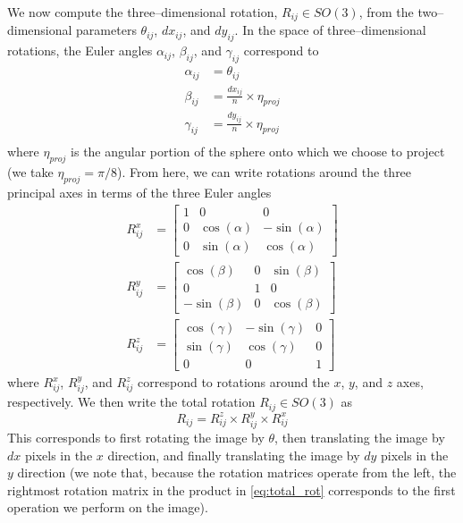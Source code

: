 \documentclass[12pt]{article}
\begin{document}
We now compute the three--dimensional rotation, $R_{ij} \in SO(3)$, from the two--dimensional parameters $\theta_{ij}$, $dx_{ij}$, and $dy_{ij}$.
%
In the space of three--dimensional rotations, the Euler angles $\alpha_{ij}$, $\beta_{ij}$, and $\gamma_{ij}$ correspond to
\begin{equation} \label{eq:angle_relations}
\begin{aligned}
	\alpha_{ij} &= \theta_{ij} \\
	\beta_{ij} &= \frac{dx_{ij}}{n} \times \eta_{proj} \\
	\gamma_{ij} &= \frac{dy_{ij}}{n} \times \eta_{proj} \\
\end{aligned}
\end{equation}
where $\eta_{proj}$ is the angular portion of the sphere onto which we choose to project (we take $\eta_{proj} =  \pi/8$).
%
From here, we can write rotations around the three principal axes in terms of the three Euler angles
\begin{equation}
\begin{aligned}
	R^x_{ij} &= \begin{bmatrix}
	1 & 0 & 0 \\
    0 & \cos(\alpha) & -\sin(\alpha) \\
    0 & \sin(\alpha) & \cos(\alpha)
	\end{bmatrix} \\
	R^y_{ij} &= \begin{bmatrix}
	\cos(\beta) & 0 & \sin(\beta) \\
    0 & 1 & 0 \\
    -\sin(\beta) & 0 & \cos(\beta)
    \end{bmatrix} \\
	R^z_{ij} &= \begin{bmatrix} 
	\cos(\gamma) & -\sin(\gamma) & 0 \\
    \sin(\gamma) & \cos(\gamma) & 0 \\
    0 & 0 & 1 
    \end{bmatrix}
\end{aligned}
\end{equation}
where $R^x_{ij}$, $R^y_{ij}$, and $R^z_{ij}$ correspond to rotations around the $x$, $y$, and $z$ axes, respectively.
%
We then write the total rotation $R_{ij} \in SO(3)$ as 
\begin{equation} \label{eq:total_rot}
	R_{ij}	 = R^z_{ij} \times R^y_{ij} \times R^x_{ij}
\end{equation}
%
This corresponds to first rotating the image by $\theta$, then translating the image by $dx$ pixels in the $x$ direction, and finally translating the image by $dy$ pixels in the $y$ direction (we note that, because the rotation matrices operate from the left, the rightmost rotation matrix in the product in \eqref{eq:total_rot} corresponds to the first operation we perform on the image).
\end{document}
